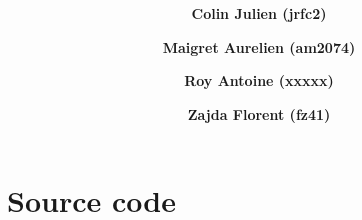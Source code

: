 \documentclass[12pt]{article}
\title{
\vspace{2in}
\Huge{\textmd{\textbf{\hmwkTitle}}}
\vspace{3in}
}
\author{
	\textbf{Colin Julien (jrfc2)}
	\and
	\textbf{Maigret Aurelien (am2074)}
	\and
	\textbf{Roy Antoine (xxxxx)}
	\and
	\textbf{Zajda Florent (fz41)}
}
\date{\hmwkDueDate}
\begin{document}
\maketitle




\newpage






\section{Source code}
\end{document}
